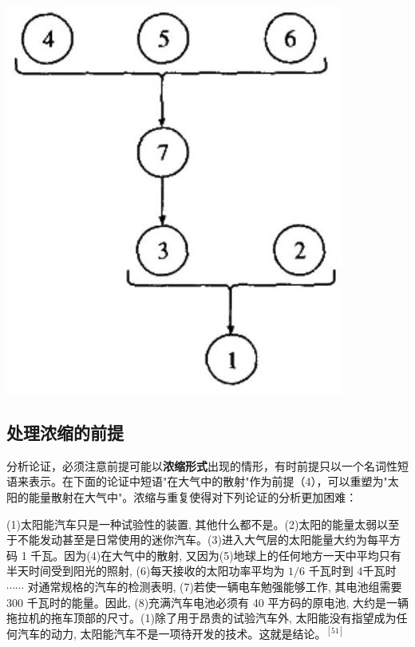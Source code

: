 \begin{center}
\includegraphics[width=\textwidth]{images/2025_05_15_6a28331d5e7c993ad07ag-073.jpg}
\end{center}

\subsection{处理浓缩的前提}

分析论证，必须注意前提可能以\textbf{浓缩形式}出现的情形，有时前提只以一个名词性短语来表示。在下面的论证中短语"在大气中的散射"作为前提（4），可以重塑为"太阳的能量散射在大气中"。浓缩与重复使得对下列论证的分析更加困难：

\begin{displayquote}
(1)太阳能汽车只是一种试验性的装置, 其他什么都不是。(2)太阳的能量太弱以至于不能发动甚至是日常使用的迷你汽车。(3)进入大气层的太阳能量大约为每平方码 1 千瓦。因为(4)在大气中的散射, 又因为(5)地球上的任何地方一天中平均只有半天时间受到阳光的照射, (6)每天接收的太阳功率平均为 $1 / 6$ 千瓦时到 4千瓦时 $\cdots \cdots$ 对通常规格的汽车的检测表明, (7)若使一辆电车勉强能够工作, 其电池组需要 300 千瓦时的能量。因此, (8)充满汽车电池必须有 40 平方码的原电池, 大约是一辆拖拉机的拖车顶部的尺寸。(1)除了用于昂贵的试验汽车外, 太阳能没有指望成为任何汽车的动力, 太阳能汽车不是一项待开发的技术。这就是结论。$^{[51]}$
\end{displayquote}

